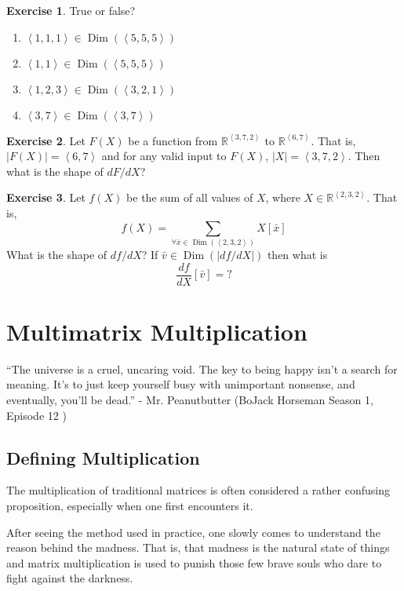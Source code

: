 \documentclass[12pt]{book}
\theoremstyle{plain}
\theoremstyle{definition}
\newtheorem{exercise}{Exercise}[chapter]
\theoremstyle{ppart}
\theoremstyle{case}
\theoremstyle{solution}
\DeclareMathOperator{\Dim}{Dim}
\newcommand{\shape}[1]{\left|#1\right|}
\begin{document}
\begin{exercise}
True or false?
\begin{enumerate}
\item $\left<1,1,1\right> \in \Dim(\left<5,5,5\right>)$
\item $\left<1,1\right> \in \Dim(\left<5,5,5\right>)$
\item $\left<1,2,3\right> \in \Dim(\left<3,2,1\right>)$
\item $\left<3,7\right> \in \Dim(\left<3,7\right>)$
\end{enumerate}
\end{exercise}

\begin{exercise}
Let $F(X)$ be a function from $\mathbb{R}^{\left<3,7,2\right>}$ to
$\mathbb{R}^{\left<6, 7\right>}$. That is, $\shape{F(X)} = \left<6,7\right>$
and for any valid input to $F(X)$, $\shape{X} = \left<3,7,2\right>$.
Then what is the shape of $dF/dX$?
\end{exercise}

\begin{exercise}
Let $f(X)$ be the sum of all values of $X$, where
$X \in \mathbb{R}^{\left<2,3,2\right>}$. That is,
\[ f(X) = \sum_{\forall \bar{x} \in \Dim(\left<2,3,2\right>)} X[\bar{x}] \]
What is the shape of $df/dX$? If $\bar{v} \in \Dim(\shape{df/dX})$ then what is
\[ \frac{df}{dX}[\bar{v}] = ? \]
\end{exercise}

\chapter{Multimatrix Multiplication}

\begin{displayquote}
``The universe is a cruel, uncaring void. The key to being happy isn't a search
for meaning. It's to just keep yourself busy with unimportant nonsense, and eventually,
you'll be dead.'' - Mr. Peanutbutter (BoJack Horseman Season 1, Episode 12
\cite{bojack})
\end{displayquote}

\section{Defining Multiplication}

The multiplication of traditional matrices is often considered a rather confusing
proposition, especially when one first encounters it.

After seeing the method used in practice, one slowly comes to understand the
reason behind the madness. That is, that madness is the natural state of things
and matrix multiplication is used to punish those few brave souls who dare to
fight against the darkness.
\end{document}
